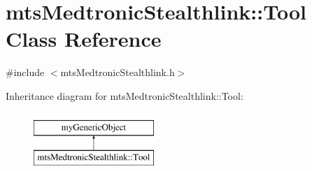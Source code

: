 \hypertarget{classmts_medtronic_stealthlink_1_1_tool}{}\section{mts\+Medtronic\+Stealthlink\+:\+:Tool Class Reference}
\label{classmts_medtronic_stealthlink_1_1_tool}


{\ttfamily \#include $<$mts\+Medtronic\+Stealthlink.\+h$>$}

Inheritance diagram for mts\+Medtronic\+Stealthlink\+:\+:Tool\+:\begin{figure}[H]
\begin{center}
\leavevmode
\includegraphics[height=2.000000cm]{dd/d1d/classmts_medtronic_stealthlink_1_1_tool}
\end{center}
\end{figure}
